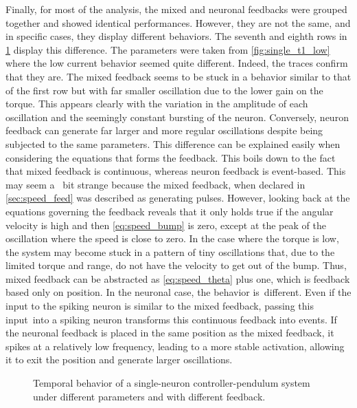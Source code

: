 Finally, for most of the analysis, the mixed and neuronal feedbacks were grouped together and showed identical performances.
However, they are not the same, and in specific cases, they display different behaviors.
The seventh and eighth rows in \cref{fig:single_control_traces} display this difference.
The parameters were taken from \cref{fig:single_t1_low} where the low current behavior seemed quite different.
Indeed, the traces confirm that they are.
The mixed feedback seems to be stuck in a behavior similar to that of the first row but with far smaller oscillation due to the lower gain on the torque.
This appears clearly with the variation in the amplitude of each oscillation and the seemingly constant bursting of the neuron.
Conversely, neuron feedback can generate far larger and more regular oscillations despite being subjected to the same parameters.
This difference can be explained easily when considering the equations that forms the feedback.
This boils down to the fact that mixed feedback is continuous, whereas neuron feedback is event-based.
This may seem a  bit strange because the mixed feedback, when declared in \cref{sec:speed_feed} was described as generating pulses.
However, looking back at the equations governing the feedback reveals that it only holds true if the angular velocity is high and then \cref{eq:speed_bump} is zero, except at the peak of the oscillation where the speed is close to zero.
In the case where the torque is low, the system may become stuck in a pattern of tiny oscillations that, due to the limited torque and range, do not have the velocity to get out of the bump.
Thus, mixed feedback can be abstracted as \cref{eq:speed_theta} plus one, which is feedback based only on position.\label{par:mixed_problem}
In the neuronal case, the behavior is different.
Even if the input to the spiking neuron is similar to the mixed feedback, passing this input into a spiking neuron transforms this continuous feedback into events.
If the neuronal feedback is placed in the same position as the mixed feedback, it spikes at a relatively low frequency, leading to a more stable activation, allowing it to exit the position and generate larger oscillations.

\begin{figure}[!htbp]
    \centering
    \caption{Temporal behavior of a single-neuron controller-pendulum system under different parameters and with different feedback.}
    \label{fig:single_control_traces}
\end{figure}

